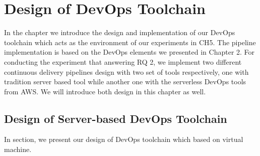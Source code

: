 \chapter{Design of DevOps Toolchain}
In the chapter we introduce the design and implementation of our DevOps toolchain which acts as the environment of our experiments in CH5. The pipeline implementation is based on the DevOps elements we presented in Chapter 2. For conducting the experiment that answering RQ 2, we implement two different continuous delivery pipelines design with two set of tools respectively, one with tradition server based tool while another one with the serverless DevOps tools from AWS. We will introduce both design in this chapter as well.

\section{Design of Server-based DevOps Toolchain}
In section, we present our design of DevOps toolchain which based on virtual machine.
